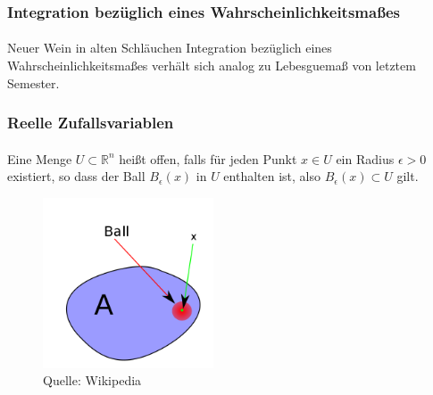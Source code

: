 \documentclass{beamer}
\begin{document}
\begin{frame}
    \frametitle{Integration bezüglich eines Wahrscheinlichkeitsmaßes}
\framesubtitle{}

\begin{block}{Neuer Wein in alten Schläuchen}
Integration bezüglich eines Wahrscheinlichkeitsmaßes verhält sich analog zu Lebesguemaß von letztem Semester.
\end{block}

 \end{frame}


\begin{frame}
    \frametitle{Reelle Zufallsvariablen}
\framesubtitle{}

\begin{block}{}
Eine Menge $U \subset  \mathbb{R}^n$ heißt offen, falls für jeden Punkt $x \in U$ ein Radius $\epsilon > 0$ existiert, so dass der Ball $B_\epsilon (x)$ in $U$ enthalten ist, also 
$B_\epsilon (x) \subset U$ gilt.
\end{block}

\begin{figure}[htp]
      \centering
    \includegraphics[width=0.45\textwidth]{img/openset}
      \caption{Quelle: Wikipedia}
\end{figure}


 \end{frame}
\end{document}
